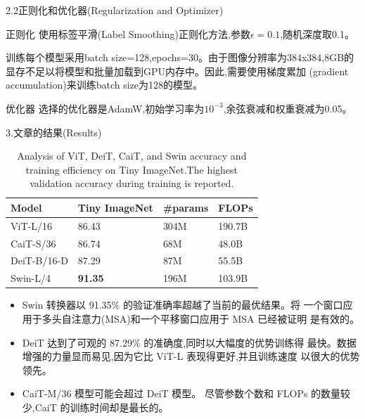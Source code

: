 \documentclass[UTF8]{ctexbeamer}
\begin{document}
\begin{frame}{2.2正则化和优化器(Regularization and Optimizer)}
  \begin{block}{正则化}
    使用标签平滑(Label Smoothing)正则化方法,参数$\epsilon = 0.1$,随机深度取0.1。

    训练每个模型采用batch size=128,epochs=30。由于图像分辨率为384x384,8GB的
    显存不足以将模型和批量加载到GPU内存中。因此,需要使用梯度累加
    (gradient accumulation)来训练batch size为128的模型。
  \end{block}
  \begin{block}{优化器}
    选择的优化器是AdamW,初始学习率为$10^{-3}$,余弦衰减和权重衰减为0.05。
  \end{block}
\end{frame}

\begin{frame}{3.文章的结果(Results)}
  \begin{table}[h]
    \centering
    \begin{tabular}{|l|l|l|l|}
    \hline
    Model & Tiny ImageNet & \#params & FLOPs \\
    \hline
    ViT-L/16 & 86.43 & 304M & 190.7B \\
    CaiT-S/36 & 86.74 & 68M & 48.0B \\
    DeiT-B/16-D & 87.29 & 87M & 55.5B \\
    Swin-L/4 & \textbf{91.35} & 196M & 103.9B \\
    \hline
    \end{tabular}
    \caption{Analysis of ViT, DeiT, CaiT, and Swin accuracy and training
     efficiency on Tiny ImageNet.The highest validation accuracy during training is reported.}
    \end{table}
    \begin{itemize}
      \item Swin 转换器以 91.35\% 的验证准确率超越了当前的最优结果。将
      一个窗口应用于多头自注意力(MSA)和一个平移窗口应用于 MSA 已经被证明
      是有效的。
      \item DeiT 达到了可观的 87.29\% 的准确度,同时以大幅度的优势训练得
      最快。数据增强的力量显而易见,因为它比 ViT-L 表现得更好,并且训练速度
      以很大的优势领先。
      \item CaiT-M/36 模型可能会超过 DeiT 模型。
      尽管参数个数和 FLOPs 的数量较少,CaiT 的训练时间却是最长的。
    \end{itemize}
\end{frame}
\end{document}
